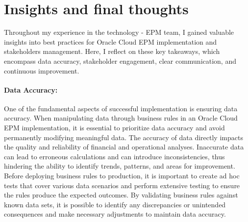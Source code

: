 \documentclass[12pt,a4paper,openright,twoside]{book}
\begin{document}
\section{Insights and final thoughts}

Throughout my experience in the technology - EPM team, I gained valuable insights into best practices for Oracle Cloud EPM implementation and stakeholders management.
%
Here, I reflect on these key takeaways, which encompass data accuracy, stakeholder engagement, clear communication, and continuous improvement.

\paragraph{Data Accuracy:}
One of the fundamental aspects of successful implementation is ensuring data accuracy. 
%
When manipulating data through business rules in an Oracle Cloud EPM implementation, it is essential to prioritize data accuracy and avoid permanently modifying meaningful data. 
%
The accuracy of data directly impacts the quality and reliability of financial and operational analyses. 
%
Inaccurate data can lead to erroneous calculations and can introduce inconsistencies, thus hindering the ability to identify trends, patterns, and areas for improvement.
%
Before deploying business rules to production, it is important to create ad hoc tests that cover various data scenarios and perform extensive testing to ensure the rules produce the expected outcomes. 
%
By validating business rules against known data sets, it is possible to identify any discrepancies or unintended consequences and make necessary adjustments to maintain data accuracy.
\end{document}
